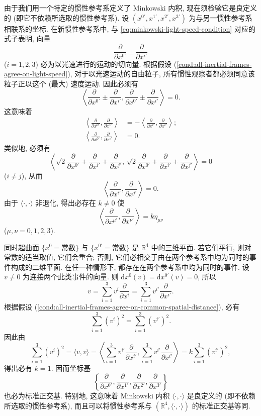 由于我们用一个特定的惯性参考系定义了 Minkowski 内积, 现在须检验它是良定义的 (即它不依赖所选取的惯性参考系). 设 $(x^{0'},x^{1'},x^{2'},x^{3'})$ 为与另一惯性参考系相联系的坐标. 在新惯性参考系中, 与 \eqref{eq:minkowski-light-speed-condition} 对应的式子表明, 向量
\[
  \frac{\partial}{\partial x^{0'}}\pm\frac{\partial}{\partial x^{i'}}
\]
($i=1,2,3$) 必为以光速进行的运动的切向量. 根据假设 (\ref{cond:all-inertial-frames-agree-on-light-speed}), 对于以光速运动的自由粒子, 所有惯性观察者都必须同意该粒子正以这个 (最大) 速度运动. 因此必须有
\[
  \left\langle\frac{\partial}{\partial x^{0'}}\pm\frac{\partial}{\partial x^{i'}},
              \frac{\partial}{\partial x^{0'}}\pm\frac{\partial}{\partial x^{i'}}\right\rangle=0.
\]
这意味着
\begin{align*}
  \left\langle\frac{\partial}{\partial x^{0'}},\frac{\partial}{\partial x^{0'}}\right\rangle
    &=-\left\langle\frac{\partial}{\partial x^{i'}},\frac{\partial}{\partial x^{i'}}\right\rangle;\\
  \left\langle\frac{\partial}{\partial x^{0'}},\frac{\partial}{\partial x^{i'}}\right\rangle
    &=0.
\end{align*}
类似地, 必须有
\[
  \left\langle\sqrt{2}\frac{\partial}{\partial x^{0'}}+\frac{\partial}{\partial x^{i'}}
               +\frac{\partial}{\partial x^{j'}},\,
              \sqrt{2}\frac{\partial}{\partial x^{0'}}+\frac{\partial}{\partial x^{i'}}
               +\frac{\partial}{\partial x^{j'}}\right\rangle=0
\]
($i\ne j$), 从而
\[
  \left\langle\frac{\partial}{\partial x^{i'}},
              \frac{\partial}{\partial x^{j'}}\right\rangle=0.
\]
由于 $\langle\cdot,\cdot\rangle$ 非退化, 得出必存在 $k\ne0$ 使
\[
  \left\langle\frac{\partial}{\partial x^{\mu'}},
              \frac{\partial}{\partial x^{\nu'}}\right\rangle=k\eta_{\mu\nu}
\]
($\mu,\nu=0,1,2,3$).

同时超曲面 $\{x^0=\text{常数}\}$ 与 $\{x^{0'}=\text{常数}\}$ 是 $\mathbb{R}^4$ 中的三维平面. 若它们平行, 则对常数的适当取值, 它们会重合; 否则, 它们必相交于由在两个参考系中均为同时的事件构成的二维平面. 在任一种情形下, 都存在在两个参考系中均为同时的事件. 设 $v\ne0$ 为连接两个此类事件的向量. 则 $\mathrm{d}x^0(v)=\mathrm{d}x^{0'}(v)=0$, 所以
\[
  v=\sum_{i=1}^3 v^i\frac{\partial}{\partial x^i}
    =\sum_{i=1}^3 v^{i'}\frac{\partial}{\partial x^{i'}}.
\]
根据假设 (\ref{cond:all-inertial-frames-agree-on-common-spatial-distance}), 必有
\[
  \sum_{i=1}^3(v^i)^2=\sum_{i=1}^3(v^{i'})^2.
\]
因此由
\[
  \sum_{i=1}^3(v^i)^2=\langle v,v\rangle
  =\left\langle\sum_{i=1}^3v^{i'}\frac{\partial}{\partial x^{i'}},
               \sum_{i=1}^3v^{i'}\frac{\partial}{\partial x^{i'}}\right\rangle
  =k\sum_{i=1}^3(v^{i'})^2,
\]
得出必有 $k=1$. 因而坐标基
\[
  \left\{\frac{\partial}{\partial x^{0'}},\frac{\partial}{\partial x^{1'}},
         \frac{\partial}{\partial x^{2'}},\frac{\partial}{\partial x^{3'}}\right\}
\]
也必为标准正交基. 特别地, 这意味着 Minkowski 内积 $\langle\cdot,\cdot\rangle$ 是良定义的 (即不依赖所选取的惯性参考系), 而且\label{idx:orthonormal-basis-of-minkowski-inner-product}可以将惯性参考系与 $(\mathbb{R}^4,\langle\cdot,\cdot\rangle)$ 的标准正交基等同.

